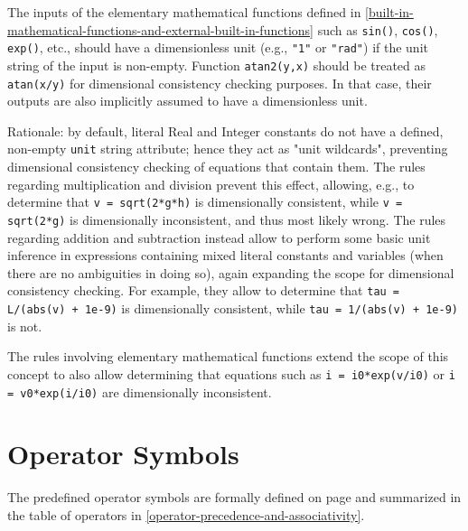 The inputs of the elementary mathematical functions defined in \cref{built-in-mathematical-functions-and-external-built-in-functions} such as \lstinline!sin()!, \lstinline!cos()!, \lstinline!exp()!, etc., should have a dimensionless unit (e.g., \lstinline!"1"! or \lstinline!"rad"!) if the unit string of the input is non-empty. Function \lstinline!atan2(y,x)! should be treated as  \lstinline!atan(x/y)! for dimensional consistency checking purposes.
In that case, their outputs are also implicitly assumed to have a dimensionless unit.

\begin{nonnormative}
Rationale: by default, literal Real and Integer constants do not have a defined, non-empty \lstinline!unit! string attribute; hence they act as "unit wildcards", preventing dimensional consistency checking of equations that contain them.
The rules regarding multiplication and division prevent this effect, allowing, e.g., to determine that \lstinline!v = sqrt(2*g*h)! is dimensionally consistent, while \lstinline!v = sqrt(2*g)! is dimensionally inconsistent, and thus most likely wrong.
The rules regarding addition and subtraction instead allow to perform some basic unit inference in expressions containing mixed literal constants and variables (when there are no ambiguities in doing so), again expanding the scope for dimensional consistency checking.
For example, they allow to determine that \lstinline!tau = L/(abs(v) + 1e-9)! is dimensionally consistent, while \lstinline!tau = 1/(abs(v) + 1e-9)! is not.


The rules involving elementary mathematical functions extend the scope of this concept to also allow determining that equations such as \lstinline!i = i0*exp(v/i0)! or \lstinline!i = v0*exp(i/i0)! are dimensionally inconsistent.
\end{nonnormative}

\section{Operator Symbols}\label{operator-symbols}

The predefined operator symbols are formally defined on page \pageref{lexical-conventions} and
summarized in the table of operators in \cref{operator-precedence-and-associativity}.

